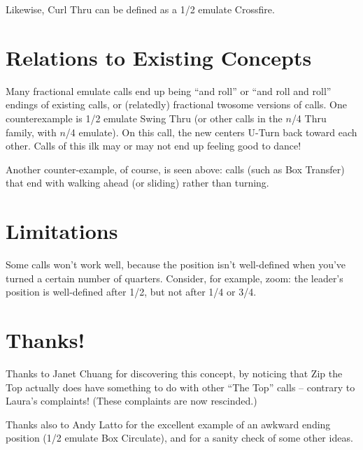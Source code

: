 \documentclass[11pt]{article}
\begin{document}


Likewise, Curl Thru can be defined
as a 1/2 emulate Crossfire.

\section{Relations to Existing Concepts}

Many fractional emulate calls end up being ``and roll'' or ``and roll and
roll'' endings of existing calls,
or (relatedly) fractional twosome versions of calls.
One counterexample is 1/2 emulate Swing Thru
(or other calls in the $n$/4 Thru family, with $n$/4 emulate).
On this call, the new centers U-Turn back toward each other.
Calls of this ilk may or may not end up feeling good to dance!

Another counter-example, of course, is seen above:
calls (such as Box Transfer) that end with walking ahead
(or sliding) rather than turning.

\section{Limitations}

Some calls won't work well, because the position isn't well-defined
when you've turned a certain number of quarters.  Consider, for
example, zoom: the leader's position is well-defined after 1/2, but
not after 1/4 or 3/4.


\section{Thanks!}

Thanks to Janet Chuang for discovering this concept,
by noticing that Zip the Top actually does have something to do
with other ``The Top'' calls -- contrary to Laura's complaints!
(These complaints are now rescinded.)

Thanks also to Andy Latto for the excellent example
of an awkward ending position (1/2 emulate Box Circulate),
and for a sanity check of some other ideas.
\end{document}
